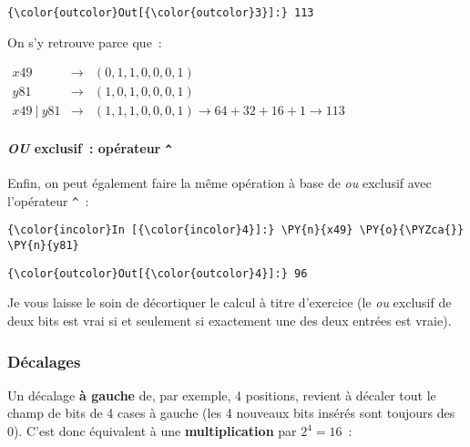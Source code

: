 \begin{Verbatim}[commandchars=\\\{\}]
{\color{outcolor}Out[{\color{outcolor}3}]:} 113
\end{Verbatim}
            
    On s'y retrouve parce que~:

\(\begin{array}{rcl} x49 & \rightarrow & (0,1,1,0,0,0,1) \\ y81 & \rightarrow & (1,0,1,0,0,0,1) \\ x49\ |\ y81 & \rightarrow & (1,1,1,0,0,0,1) \rightarrow 64 + 32 + 16 + 1 \rightarrow 113 \end{array}\)

    \hypertarget{ou-exclusif-opuxe9rateur}{%
\paragraph{\texorpdfstring{\emph{OU} exclusif~: opérateur
\texttt{\^{}}}{OU exclusif~: opérateur \^{}}}\label{ou-exclusif-opuxe9rateur}}

    Enfin, on peut également faire la même opération à base de \emph{ou}
exclusif avec l'opérateur \texttt{\^{}}~:

    \begin{Verbatim}[commandchars=\\\{\}]
{\color{incolor}In [{\color{incolor}4}]:} \PY{n}{x49} \PY{o}{\PYZca{}} \PY{n}{y81}
\end{Verbatim}


\begin{Verbatim}[commandchars=\\\{\}]
{\color{outcolor}Out[{\color{outcolor}4}]:} 96
\end{Verbatim}
            
    Je vous laisse le soin de décortiquer le calcul à titre d'exercice (le
\emph{ou} exclusif de deux bits est vrai si et seulement si exactement
une des deux entrées est vraie).

    \hypertarget{duxe9calages}{%
\subsubsection{Décalages}\label{duxe9calages}}

    Un décalage \textbf{à gauche} de, par exemple, 4 positions, revient à
décaler tout le champ de bits de 4 cases à gauche (les 4 nouveaux bits
insérés sont toujours des 0). C'est donc équivalent à une
\textbf{multiplication} par \(2^4 = 16\)~:

